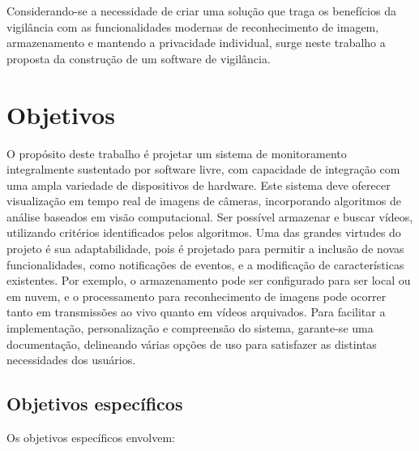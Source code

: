 \documentclass[12pt, %
openright, 
oneside, %
a4paper,    %
brazil]{facom-ufu-abntex2}
\begin{document}
Considerando-se a necessidade de criar uma solução que traga os benefícios da
vigilância com as funcionalidades modernas de reconhecimento de imagem,
armazenamento e mantendo a privacidade individual, surge neste trabalho a
proposta da construção de um software de vigilância.

\section{Objetivos}

O propósito deste trabalho é projetar um sistema de monitoramento integralmente
sustentado por software livre, com capacidade de integração com uma ampla
variedade de dispositivos de hardware. Este sistema deve oferecer visualização
em tempo real de imagens de câmeras, incorporando algoritmos de análise
baseados em visão computacional. Ser possível armazenar e buscar vídeos,
utilizando critérios identificados pelos algoritmos. Uma das grandes virtudes
do projeto é sua adaptabilidade, pois é projetado para permitir a inclusão de
novas funcionalidades, como notificações de eventos, e a modificação de
características existentes. Por exemplo, o armazenamento pode ser configurado
para ser local ou em nuvem, e o processamento para reconhecimento de imagens
pode ocorrer tanto em transmissões ao vivo quanto em vídeos arquivados. Para
facilitar a implementação, personalização e compreensão do sistema, garante-se
uma  documentação, delineando várias opções de uso para satisfazer as distintas
necessidades dos usuários.

\subsection{Objetivos específicos}

Os objetivos específicos envolvem:
\end{document}
